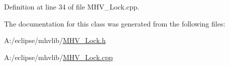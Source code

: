 Definition at line 34 of file M\-H\-V\-\_\-\-Lock.\-cpp.



The documentation for this class was generated from the following files\-:\begin{DoxyCompactItemize}
\item 
A\-:/eclipse/mhvlib/\hyperlink{_m_h_v___lock_8h}{M\-H\-V\-\_\-\-Lock.\-h}\item 
A\-:/eclipse/mhvlib/\hyperlink{_m_h_v___lock_8cpp}{M\-H\-V\-\_\-\-Lock.\-cpp}\end{DoxyCompactItemize}
